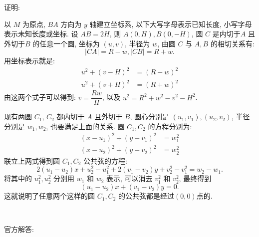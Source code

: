 \begin{figure*}[htbp]
\centering
{}
\end{figure*}

\noindent 证明: 

以 $M$ 为原点, $BA$ 方向为 $y$ 轴建立坐标系, 以下大写字母表示已知长度, 小写字母表示未知长度或坐标. 设 $AB = 2H$, 则 $A(0,H), B(0,-H)$, 圆 $C$ 是内切于$A$ 且外切于$B$ 的任意一个圆, 坐标为 $(u,v)$, 半径为 $w$, 由圆 $C$ 与 $A,B$ 的相切关系有: 
\[ |CA| = R-w, |CB| = R+w. \]
用坐标表示就是:
\begin{align*}
u^2 + (v-H)^2 &= (R-w)^2 \\
u^2 + (v+H)^2 &= (R+w)^2
\end{align*}
由这两个式子可以得到: $v = \dfrac{Rw}{H}$, 以及 $u^2 = R^2+w^2-v^2-H^2$.

现有两圆 $C_1$, $C_2$ 都内切于 $A$ 且外切于 $B$, 圆心分别是 $(u_1,v_1), (u_2,v_2)$, 半径分别是 $w_1, w_2$, 也要满足上面的关系. 圆 $C_1, C_2$ 的方程分别为:
\begin{align*}
(x-u_1)^2 + (y-v_1)^2 &= w_1^2 \\
(x-u_2)^2 + (y-v_2)^2 &= w_2^2 
\end{align*}
联立上两式得到圆 $C_1, C_2$ 公共弦的方程:
\[ 2(u_1-u_2)x + u_2^2-u_1^2 + 2(v_1-v_2)y + v_2^2-v_1^2=w_2-w_1 .\]
将其中的 $u_1^2, u_2^2$ 分别用 $w_1$ 和 $w_2$ 表示, 可以消去 $v_1^2$ 和 $v_2^2$, 最终得到
\[ (u_1-u_2)x+(v_1-v_2)y=0 .\]
这就说明了任意两个这样的圆 $C_1, C_2$ 的公共弦都是经过$(0,0)$点的.

~

\noindent 官方解答:

